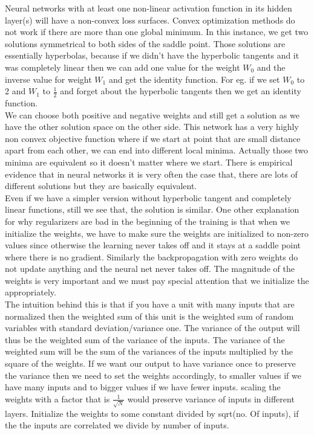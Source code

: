 Neural networks with at least one non-linear activation function in its hidden layer(s) will have a non-convex loss surfaces. Convex optimization methods do not work if there are more than one global minimum. In this instance, we get two solutions symmetrical to both sides of the saddle point. Those solutions are essentially hyperbolas, because if we didn't have the hyperbolic tangents and it was completely linear then we can add one value for the weight $W_0$ and the inverse value for weight $W_1$ and get the identity function. For eg. if we set $W_0$ to 2 and $W_1$ to $\frac{1}{2}$ and forget about the hyperbolic tangents then we get an identity function.\\

We can choose both positive and negative weights and still get a solution as we have the other solution space on the other side. This network has a very highly non convex objective function where if we start at point that are small distance apart from each other, we can end into different local minima. Actually those two minima are equivalent so it doesn’t matter where we start. There is empirical evidence that in neural networks it is very often the case that, there are lots of different solutions but they are basically equivalent. \\

Even if we have a simpler version without hyperbolic tangent and completely linear functions, still we see that, the solution is similar. One other explanation for why regularizers are bad in the beginning of the training is that when we initialize the weights, we have to make sure the weights are initialized to non-zero values since otherwise the learning never takes off and it stays at a saddle point where there is no gradient. Similarly the backpropagation with zero weights do not update anything and the neural net never takes off. The magnitude of the weights is very important and we must pay special attention that we initialize the appropriately.\\

The intuition behind this is that if you have a unit with many inputs that are normalized then the weighted sum of this unit is the weighted sum of random variables with standard deviation/variance one. The variance of the output will thus be the weighted sum of the variance of the inputs. The variance of the weighted sum will be the sum of the variances of the inputs multiplied by the square of the weights. If we want our output to have variance once to preserve the variance then we need to set the weights accordingly, to smaller values if we have many inputs and to bigger values if we have fewer inputs. scaling the weights with a factor that is $\frac{1}{\sqrt{N}}$ would preserve variance of inputs in different layers. Initialize the weights to some constant divided by sqrt(no. Of inputs), if the the inputs are correlated we divide by number of inputs. 